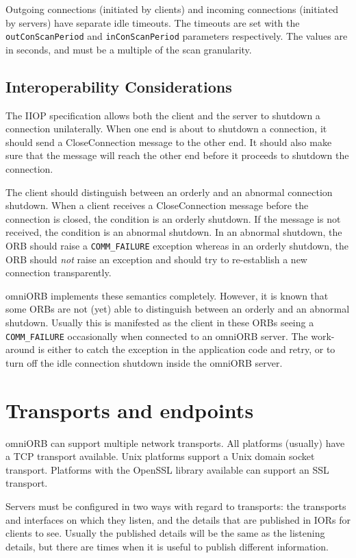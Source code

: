 \documentclass[11pt,twoside,a4paper]{book}
\newcommand{\code}[1]{\texttt{#1}}
\newcommand{\dsc}{\discretionary{}{}{}}
\begin{document}
Outgoing connections (initiated by clients) and incoming connections
(initiated by servers) have separate idle timeouts.  The timeouts are
set with the \code{outConScan\dsc{}Period} and \code{inConScanPeriod}
parameters respectively. The values are in seconds, and must be a
multiple of the scan granularity.


\subsection{Interoperability Considerations}

The IIOP specification allows both the client and the server to
shutdown a connection unilaterally. When one end is about to shutdown
a connection, it should send a CloseConnection message to the other
end. It should also make sure that the message will reach the other
end before it proceeds to shutdown the connection.

The client should distinguish between an orderly and an abnormal
connection shutdown. When a client receives a CloseConnection message
before the connection is closed, the condition is an orderly shutdown.
If the message is not received, the condition is an abnormal shutdown.
In an abnormal shutdown, the ORB should raise a \code{COMM\_FAILURE}
exception whereas in an orderly shutdown, the ORB should \emph{not}
raise an exception and should try to re-establish a new connection
transparently.

omniORB implements these semantics completely. However, it is known
that some ORBs are not (yet) able to distinguish between an orderly
and an abnormal shutdown. Usually this is manifested as the client in
these ORBs seeing a \code{COMM\_FAILURE} occasionally when connected
to an omniORB server. The work-around is either to catch the exception
in the application code and retry, or to turn off the idle connection
shutdown inside the omniORB server.



\section{Transports and endpoints}

omniORB can support multiple network transports. All platforms
(usually) have a TCP transport available. Unix platforms support a
Unix domain socket transport. Platforms with the OpenSSL library
available can support an SSL transport.

Servers must be configured in two ways with regard to transports: the
transports and interfaces on which they listen, and the details that
are published in IORs for clients to see. Usually the published
details will be the same as the listening details, but there are times
when it is useful to publish different information.
\end{document}
